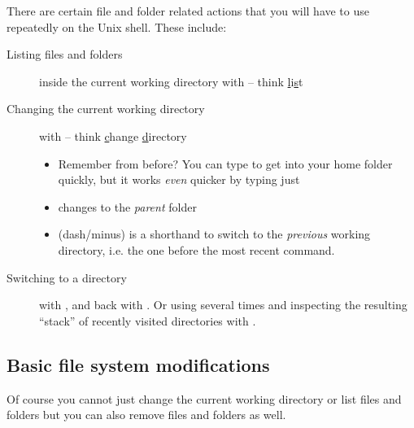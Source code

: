 \documentclass{olli-handout}
\begin{document}
\begin{hintbox}%
{\olliPenRD} There are certain file and folder related actions that you will have to use repeatedly on the Unix shell. These include:
	\begin{description}
		\item[Listing files and folders] inside the current working directory with  -- think \underline{l}i\underline{s}t
		\item[Changing the current working directory] with  -- think \underline{c}hange \underline{d}irectory
		\begin{itemize}
			\item[\olliPenR] Remember \TTQ{\mytilde} from before? You can type  to get into your home folder quickly, but it works \emph{even} quicker by typing just 
			\item[\olliPenR]  changes to the \emph{parent} folder
			\item[\olliPenR]  (dash/minus) is a shorthand to switch to the \emph{previous} working directory, i.e. the one before the most recent  command.
		\end{itemize}
		\item[Switching to a directory] with , and back with . Or using  several times and inspecting the resulting ``stack'' of recently visited directories with .
	\end{description}
\end{hintbox}

\subsection{Basic file system modifications}

Of course you cannot just change the current working directory or list files and folders but you can also remove files and folders as well.
\end{document}
